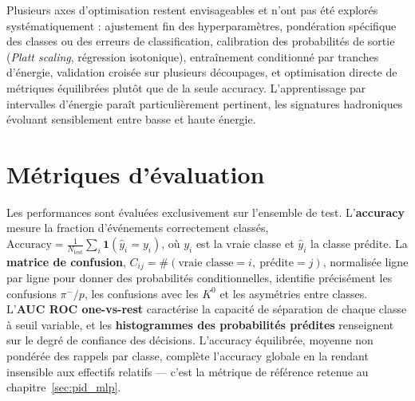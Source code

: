Plusieurs axes d'optimisation restent envisageables et n'ont pas été explorés systématiquement : ajustement fin des hyperparamètres, pondération spécifique des classes ou des erreurs de classification, calibration des probabilités de sortie (\emph{Platt scaling}, régression isotonique), entraînement conditionné par tranches d'énergie, validation croisée sur plusieurs découpages, et optimisation directe de métriques équilibrées plutôt que de la seule accuracy. L'apprentissage par intervalles d'énergie paraît particulièrement pertinent, les signatures hadroniques évoluant sensiblement entre basse et haute énergie.

\section{Métriques d'évaluation}
\label{app:pid_metrics}

Les performances sont évaluées exclusivement sur l'ensemble de test. L'\textbf{accuracy} mesure la fraction d'événements correctement classés,
\(\mathrm{Accuracy} = \frac{1}{N_{\mathrm{test}}}\sum_i \mathbf{1}(\hat{y}_i = y_i)\),
où \(y_i\) est la vraie classe et \(\hat{y}_i\) la classe prédite. La \textbf{matrice de confusion}, \(C_{ij} = \#(\text{vraie classe}=i,\ \text{prédite}=j)\), normalisée ligne par ligne pour donner des probabilités conditionnelles, identifie précisément les confusions \(\pi^-/p\), les confusions avec les \(K^0\) et les asymétries entre classes. L'\textbf{AUC ROC one-vs-rest} caractérise la capacité de séparation de chaque classe à seuil variable, et les \textbf{histogrammes des probabilités prédites} renseignent sur le degré de confiance des décisions. L'accuracy équilibrée, moyenne non pondérée des rappels par classe, complète l'accuracy globale en la rendant insensible aux effectifs relatifs — c'est la métrique de référence retenue au chapitre~\ref{sec:pid_mlp}.
